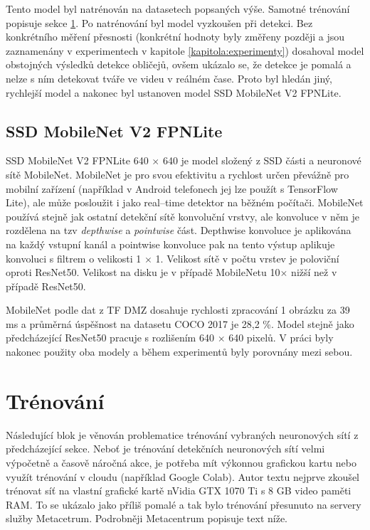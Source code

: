 Tento model byl natrénován na datasetech popsaných výše. Samotné trénování popisuje sekce \ref{sekce:trenovani}. Po natrénování byl model vyzkoušen při detekci. Bez konkrétního měření přesnosti (konkrétní hodnoty byly změřeny později a jsou zaznamenány v experimentech v kapitole \ref{kapitola:experimenty}) dosahoval model obstojných výsledků detekce obličejů, ovšem ukázalo se, že detekce je pomalá a nelze s ním detekovat tváře ve videu v reálném čase. Proto byl hledán jiný, rychlejší model a nakonec byl ustanoven model SSD MobileNet V2 FPNLite.

\subsection*{SSD MobileNet V2 FPNLite}
SSD MobileNet V2 FPNLite 640 $\times$ 640 je model složený z SSD části a neuronové sítě MobileNet. MobileNet \cite{mobilenet} je pro svou efektivitu a rychlost určen převážně pro mobilní zařízení (například v Android telefonech jej lze použít s TensorFlow Lite), ale může posloužit i jako real--time detektor na běžném počítači. MobileNet používá stejně jak ostatní  detekční sítě konvoluční vrstvy, ale konvoluce v něm je rozdělena na tzv \emph{depthwise} a \emph{pointwise} část. Depthwise konvoluce je aplikována na každý vstupní kanál a pointwise konvoluce pak na tento výstup aplikuje konvoluci s filtrem o velikosti 1 $\times$ 1. Velikost sítě v počtu vrstev je poloviční oproti ResNet50. Velikost na disku je v případě MobileNetu 10$\times$ nižší než v případě ResNet50.

MobileNet podle dat z TF DMZ dosahuje rychlosti zpracování 1 obrázku za 39 ms a průměrná úspěšnost na datasetu COCO 2017 je 28,2 \%. Model stejně jako předcházející ResNet50 pracuje s rozlišením 640 $\times$ 640 pixelů. V práci byly nakonec použity oba modely a během experimentů byly porovnány mezi sebou.

\section{Trénování}
\label{sekce:trenovani}
Následující blok je věnován problematice trénování vybraných neuronových sítí z předcházející sekce. Neboť je trénování detekčních neuronových sítí velmi výpočetně a časově náročná akce, je potřeba mít výkonnou grafickou kartu nebo využít trénování v cloudu (například Google Colab). Autor textu nejprve zkoušel trénovat síť na vlastní grafické kartě nVidia GTX 1070 Ti s 8 GB video paměti RAM. To se ukázalo jako příliš pomalé a tak bylo trénování přesunuto na servery služby Metacetrum. Podrobněji Metacentrum popisuje text níže.


